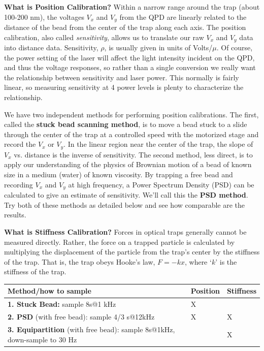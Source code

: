 \documentclass{../lab}
\begin{document}
\textbf{What is Position Calibration?} Within a narrow range around the trap (about 100-200 nm), the voltages $V_x$ and $V_y$ from the QPD are linearly related \cite{Gittes} to the distance of the bead from the center of the trap along each axis. The position calibration, also called \emph{sensitivity}, allows us to translate our raw $V_x$ and $V_y$ data into distance data. Sensitivity, $\rho$, is usually given in units of Volts/$\mu$. Of course, the power setting of the laser will affect the light intensity incident on the QPD, and thus the voltage responses, so rather than a single conversion we really want the relationship between sensitivity and laser power. This normally is fairly linear, so measuring sensitivity at 4 power levels is plenty to characterize the relationship.

We have two independent methods for performing position calibrations. The first, called the \textbf{stuck bead scanning method}, is to move a bead stuck to a slide through the center of the trap at a controlled speed with the motorized stage and record the $V_x$ or $V_y$. In the linear region near the center of the trap, the slope of $V_x$ vs. distance is the inverse of sensitivity. The second method, less direct, is to apply our understanding of the physics of Brownian motion of a bead of known size in a medium (water) of known viscosity. By trapping a free bead and recording $V_x$ and $V_y$ at high frequency, a Power Spectrum Density (PSD) can be calculated to give an estimate of sensitivity. We'll call this the \textbf{PSD method}. Try both of these methods as detailed below and see how comparable are the results.

\textbf{What is Stiffness Calibration?} Forces in optical traps generally cannot be measured directly. Rather, the force on a trapped particle is calculated by multiplying the displacement of the particle from the trap's center by the stiffness of the trap. That is, the trap obeys Hooke's law, $F = -k x$, where `$k$' is the stiffness of the trap.

\begin{center}
    \begin{tabular}{l|l|l}
        Method/how to sample & Position & Stiffness \\\hline
        \textbf{1. Stuck Bead:} sample 8s@1 kHz & X & \\\hline
        \textbf{2. PSD} (with free bead): sample 4/3 s@12kHz & X & X \\\hline
        \textbf{3. Equipartition} (with free bead): sample 8s@1kHz, down-sample to 30 Hz & & X
    \end{tabular}
\end{center}
\end{document}
